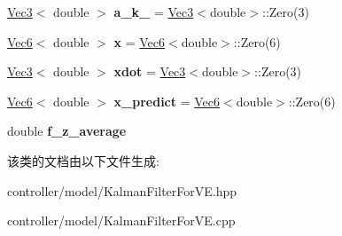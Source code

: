 \begin{DoxyCompactItemize}
\item 
\mbox{\label{classKalmanFilterForVE_a54ab47a8ad5673382cc87399b746926b}} 
\hyperlink{cppTypes_8h_a65c27bf97693676535dd0b30ea0ad399}{Vec3}$<$ double $>$ {\bfseries a\+\_\+k\+\_} = \hyperlink{cppTypes_8h_a65c27bf97693676535dd0b30ea0ad399}{Vec3}$<$double$>$\+::Zero(3)
\item 
\mbox{\label{classKalmanFilterForVE_a6735a26dbd71a26f73538480ba758338}} 
\hyperlink{cppTypes_8h_a27bb8a600520708a5928332e4e52a92e}{Vec6}$<$ double $>$ {\bfseries x} = \hyperlink{cppTypes_8h_a27bb8a600520708a5928332e4e52a92e}{Vec6}$<$double$>$\+::Zero(6)
\item 
\mbox{\label{classKalmanFilterForVE_a244eecbced9acafdc07e22bb6c377522}} 
\hyperlink{cppTypes_8h_a65c27bf97693676535dd0b30ea0ad399}{Vec3}$<$ double $>$ {\bfseries xdot} = \hyperlink{cppTypes_8h_a65c27bf97693676535dd0b30ea0ad399}{Vec3}$<$double$>$\+::Zero(3)
\item 
\mbox{\label{classKalmanFilterForVE_a669a227f55d8991908411270fa5ab8fa}} 
\hyperlink{cppTypes_8h_a27bb8a600520708a5928332e4e52a92e}{Vec6}$<$ double $>$ {\bfseries x\+\_\+predict} = \hyperlink{cppTypes_8h_a27bb8a600520708a5928332e4e52a92e}{Vec6}$<$double$>$\+::Zero(6)
\item 
\mbox{\label{classKalmanFilterForVE_a1f8d20e72ead480aac5c52f39c7acc13}} 
double {\bfseries f\+\_\+z\+\_\+average}
\end{DoxyCompactItemize}


该类的文档由以下文件生成\+:\begin{DoxyCompactItemize}
\item 
controller/model/Kalman\+Filter\+For\+V\+E.\+hpp\item 
controller/model/Kalman\+Filter\+For\+V\+E.\+cpp\end{DoxyCompactItemize}
